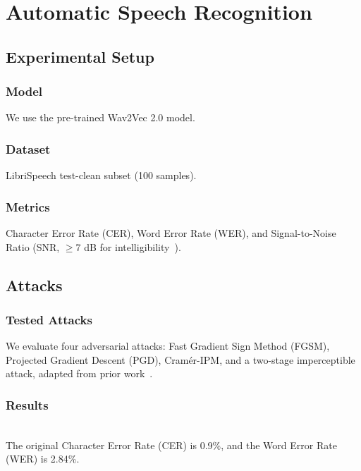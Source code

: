 \documentclass[conference]{IEEEtran}
\begin{document}
\section{Automatic Speech Recognition}

\subsection{Experimental Setup}
\subsubsection{Model}
We use the pre-trained Wav2Vec 2.0 model.

\subsubsection{Dataset}
LibriSpeech test-clean subset (100 samples).

\subsubsection{Metrics}
Character Error Rate (CER), Word Error Rate (WER), and Signal-to-Noise Ratio (SNR, $\geq$7 dB for intelligibility~\cite{MaLoizou2011}).


\subsection{Attacks}
\subsubsection{Tested Attacks}
We evaluate four adversarial attacks: Fast Gradient Sign Method (FGSM), Projected Gradient Descent (PGD), Cramér-IPM, and a two-stage imperceptible attack, adapted from prior work~\cite{goodfellow2015explaining, madry2018towardspgd, esmaeilpour2021towards, qin2019imperceptible, zelasko2021adversarial}.

    
\subsubsection{Results}\leavevmode\\
The original Character Error Rate (CER) is 0.9\%, and the Word Error Rate (WER) is 2.84\%.
\end{document}
